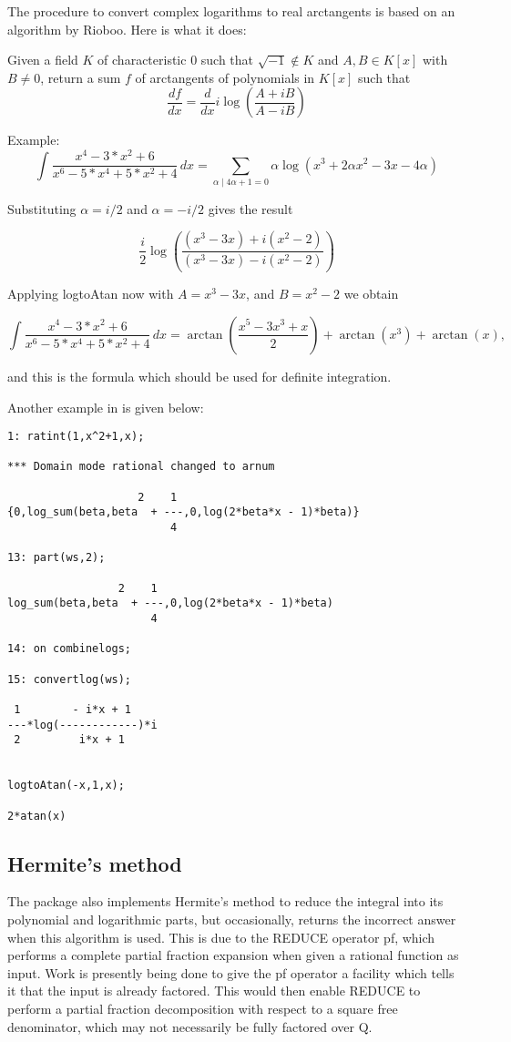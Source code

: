 The procedure to convert complex logarithms to real arctangents is based on an algorithm by Rioboo. Here is what it does:

Given a field $K$ of characteristic 0 such that $\sqrt{-1} \not\in K$ and
$A, B \in K[x]$ with $B \not = 0$, return a sum $f$ of arctangents of polynomials in $K[x]$ such that
\[  \frac{df}{dx}=\frac{d}{dx} i \log(\frac{A+ i B}{A- i B}) \]

Example:
\[ \int \frac{x^4-3*x^2+6}{x^6-5*x^4+5*x^2+4} \, dx = \sum_{ \alpha \mid 4\alpha+1=0} \alpha \log(x^3+2\alpha x^2-3 x-4 \alpha) \]

Substituting $\alpha=i/2$ and $\alpha=-i/2$ gives the result

\[ \frac{i}{2} \log(\frac{(x^3-3 x)+i (x^2-2)}{(x^3-3 x)-i (x^2-2)}) \]

Applying logtoAtan now with $A=x^3-3 x$, and $B=x^2-2$ we obtain

\[ \int \frac{x^4-3*x^2+6}{x^6-5*x^4+5*x^2+4} \, dx = \arctan(\frac{x^5-3 x^3+x}{2})+\arctan(x^3)+\arctan(x) , \]

and this is the formula which should be used for definite integration.

Another example in \REDUCE is given below:
\begin{verbatim}
1: ratint(1,x^2+1,x);

*** Domain mode rational changed to arnum

                    2    1
{0,log_sum(beta,beta  + ---,0,log(2*beta*x - 1)*beta)}
                         4

13: part(ws,2);

                 2    1
log_sum(beta,beta  + ---,0,log(2*beta*x - 1)*beta)
                      4

14: on combinelogs;

15: convertlog(ws);

 1        - i*x + 1
---*log(------------)*i
 2         i*x + 1


logtoAtan(-x,1,x);

2*atan(x)
\end{verbatim}

\subsection{Hermite's method}
The package also implements Hermite's method to reduce the integral into its polynomial and logarithmic parts, but occasionally, \REDUCE returns the incorrect answer when this algorithm is used. This is due to the REDUCE operator pf, which performs a complete partial fraction expansion when given a rational function as input. Work is presently being done to give the pf operator a facility which tells it that the input is already factored. This would then enable REDUCE to perform a partial fraction decomposition with respect to a square free denominator, which may not necessarily be fully factored over Q.

